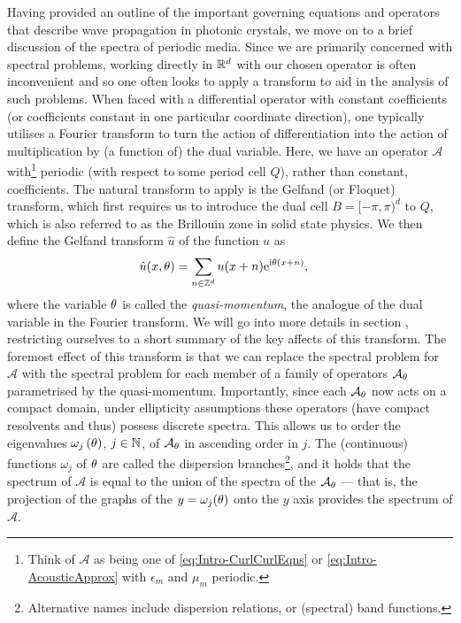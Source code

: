 Having provided an outline of the important governing equations and operators that describe wave propagation in photonic crystals, we move on to a brief discussion of the spectra of periodic media.
Since we are primarily concerned with spectral problems, working directly in $\mathbb{R}^d$ with our chosen operator is often inconvenient  and so one often looks to apply a transform to aid in the analysis of such problems.
When faced with a differential operator with constant coefficients (or coefficients constant in one particular coordinate direction), one typically utilises a Fourier transform to turn the action of differentiation into the action of multiplication by (a function of) the dual variable.
Here, we have an operator $\mathcal{A}$ with\footnote{Think of $\mathcal{A}$ as being one of \eqref{eq:Intro-CurlCurlEqns} or \eqref{eq:Intro-AcousticApprox} with $\epsilon_m$ and $\mu_m$ periodic.} periodic (with respect to some period cell $Q$), rather than constant, coefficients.
The natural transform to apply is the Gelfand (or Floquet) transform, which first requires us to introduce the dual cell $B=[-\pi,\pi)^d$ to $Q$, which is also referred to as the Brillouin zone in solid state physics.
We then define the Gelfand transform $\hat{u}$ of the function $u$ as 
\begin{align*}
	\hat{u}(x, \theta) &= \sum_{n\in\mathbb{Z}^d} u(x+n)\mathrm{e}^{\mathrm{i}\theta(x+n)},
\end{align*}
where the variable $\theta$ is called the \emph{quasi-momentum}, the analogue of the dual variable in the Fourier transform.
We will go into more details in section , restricting ourselves to a short summary of the key affects of this transform.
The foremost effect of this transform is that we can replace the spectral problem for $\mathcal{A}$ with the spectral problem for each member of a family of operators $\mathcal{A}_{\theta}$ parametrised by the quasi-momentum.
Importantly, since each $\mathcal{A}_{\theta}$ now acts on a compact domain, under ellipticity assumptions these operators (have compact resolvents and thus) possess discrete spectra.
This allows us to order the eigenvalues $\omega_j\left( \theta \right)$, $j\in\mathbb{N}$, of $\mathcal{A}_{\theta}$ in ascending order in $j$.
The (continuous) functions $\omega_j$ of $\theta$ are called the dispersion branches\footnote{Alternative names include dispersion relations, or (spectral) band functions.}, and it holds that the spectrum of $\mathcal{A}$ is equal to the union of the spectra of the $\mathcal{A}_\theta$ --- that is, the projection of the graphs of the $y=\omega_j(\theta)$ onto the $y$ axis provides the spectrum of $\mathcal{A}$.

